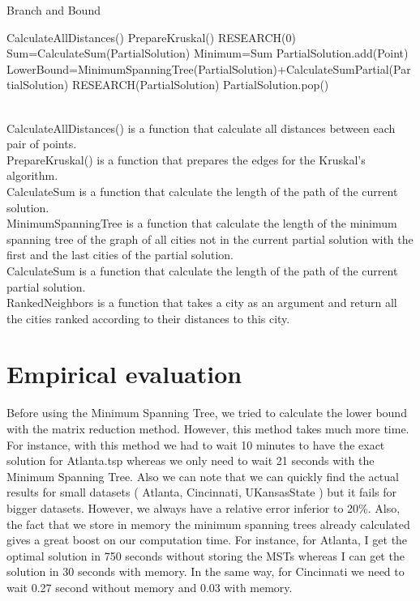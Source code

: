 \documentclass[12pt]{article}
\begin{document}
\begin{algorithm}
  \caption{Branch and Bound}\label{euclid}
  \begin{algorithmic}[1]
    \State CalculateAllDistances()
    \State PrepareKruskal()
    \State RESEARCH(0)
	\State Sum=CalculateSum(PartialSolution)
	      \State Minimum=Sum
	\EndIf
      \EndIf
	      \State PartialSolution.add(Point)
	      \State LowerBound=MinimumSpanningTree(PartialSolution)+CalculateSumPartial(PartialSolution)
		\State RESEARCH(PartialSolution)
	      \EndIf
	       \State PartialSolution.pop()
	\EndIf
      \EndFor
    \EndFunction
  \end{algorithmic}
\end{algorithm}
 \\
CalculateAllDistances() is a function that calculate all distances between each pair of points. \\
PrepareKruskal() is a function that prepares the edges for the Kruskal's algorithm. \\
CalculateSum is a function that calculate the length of the path of the current solution. \\
MinimumSpanningTree is a function that calculate the length of the minimum spanning tree of the graph of all cities not in the current partial solution with the first and the last cities of the partial solution.\\
CalculateSum is a function that calculate the length of the path of the current partial solution. \\
RankedNeighbors is a function that takes a city as an argument and return all the cities ranked according to their distances to this city. \\
 
\section{Empirical evaluation}

Before using the Minimum Spanning Tree, we tried to calculate the lower bound with the matrix reduction method. However, this method takes much more time. For instance, with this method we had to wait 10 minutes to have the exact solution for Atlanta.tsp whereas we only need to wait 21 seconds with the Minimum Spanning Tree. Also we can note that we can quickly find the actual results for small datasets ( Atlanta, Cincinnati, UKansasState ) but it fails for bigger datasets. However, we always have a relative error inferior to 20\%. Also, the fact that we store in memory the minimum spanning trees already calculated gives a great boost on our computation time. For instance, for Atlanta, I get the optimal solution in 750 seconds without storing the MSTs whereas I can get the solution in 30 seconds with memory. In the same way, for Cincinnati we need to wait 0.27 second without memory and 0.03 with memory. \\
\end{document}
